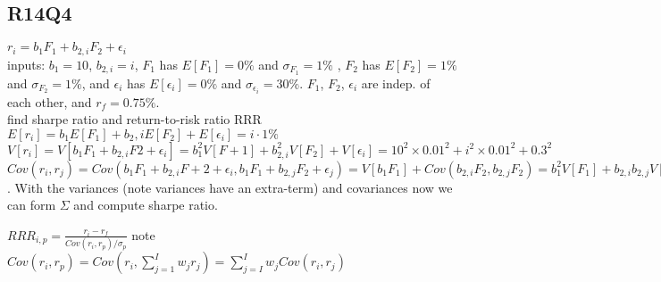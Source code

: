 \subsection*{R14Q4}
$r_i = b_{1} F_1 + b_{2,i} F_2 + \epsilon_i $\\
inputs:
$b_1=10$, $b_{2,i}=i$, 
$F_1$ has $E[F_1]=0\%$ and $\sigma_{F_1}=1\%$ , $F_2$ has  $E[F_2]=1\%$ and $\sigma_{F_2}=1\%$, and $\epsilon_i$ has $E[\epsilon_i]=0\%$ and $\sigma_{\epsilon_i}=30\%$. $F_1$, $F_2$, $\epsilon_i$ are indep. of each other, and $r_f=0.75\%$.\\
find sharpe ratio and return-to-risk ratio RRR \\
$E[r_i] = b_1E[F_1] + b_2,iE[F_2] + E[\epsilon_i]=i \cdot 1\%$ \\

$V [r_i] = V [b_1F_1 + b_{2,i}F2 + \epsilon_i]= b_1^2V[F+1] + b_{2,i}^2V [F_2] + V [\epsilon_i] =  10^2  \times 0.01^2 + i^2  \times 0.01^2 + 0.3^2$ \\
$Cov(r_i,r_j) = Cov(b_1 F_1 + b_{2,i}F+2 + \epsilon_i, b_1 F_1 + b_{2,j} F_2 + \epsilon_j) = V[b_1 F_1] + Cov(b_{2,i}F_2 , b_{2,j} F_2 ) = b_1^2 V[F_1] + b_{2,i}b_{2,j}V[F_2] = 10^2 \times 0.01^2 + i \times j \times 0.01^2 $. With the variances (note variances have an extra-term) and covariances now we can form $\Sigma$ and compute sharpe ratio.

$RRR_{i,p} = \frac{r_i-r_f}{Cov(r_i,r_p)/\sigma_p}$  note $Cov(r_i, r_p) = Cov(r_i,\sum_{j=1}^{I} w_j r_j) = \sum_{j=I}^{I}w_j Cov(r_i, r_j) $

